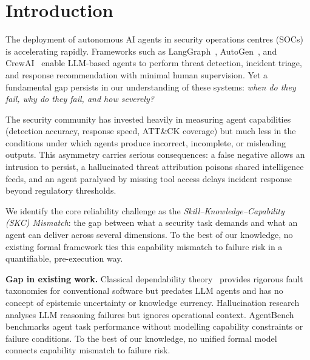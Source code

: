 \section{Introduction}

The deployment of autonomous AI agents in security operations centres
(SOCs) is accelerating rapidly. Frameworks such as LangGraph~\cite{langgraph2024},
AutoGen~\cite{wu2023autogen}, and CrewAI~\cite{crewai2024} enable LLM-based
agents to perform threat detection, incident triage, and response
recommendation with minimal human supervision. Yet a fundamental gap persists
in our understanding of these systems: \textit{when do they fail, why do they
fail, and how severely?}

The security community has invested heavily in measuring agent
capabilities (detection accuracy, response speed, ATT\&CK coverage) but
much less in the conditions under which agents produce incorrect,
incomplete, or misleading outputs. This asymmetry carries
serious consequences: a false negative allows an intrusion to persist, a
hallucinated threat attribution poisons shared intelligence feeds, and an
agent paralysed by missing tool access delays incident response beyond
regulatory thresholds.

We identify the core reliability challenge as the
\textit{Skill--Knowledge--Capability (SKC) Mismatch}: the gap between what
a security task demands and what an agent can deliver across several
dimensions. To the best of our knowledge, no existing formal framework ties this
capability mismatch to failure risk in a quantifiable, pre-execution way.

\textbf{Gap in existing work.}
Classical dependability theory~\cite{avizienis2004} provides rigorous fault
taxonomies for conventional software but predates LLM agents and has no
concept of epistemic uncertainty or knowledge currency. Hallucination
research~\cite{huang2023hallucination} analyses LLM reasoning failures but
ignores operational context. AgentBench~\cite{liu2023agentbench} benchmarks
agent task performance without modelling capability constraints or failure
conditions. To the best of our knowledge, no unified formal model
connects capability mismatch to failure risk.

